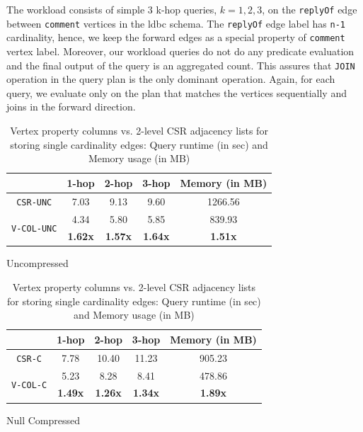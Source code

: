 The workload consists of simple 3 k-hop queries, $k=1,2,3$, on the \texttt{replyOf} edge between \texttt{comment} vertices in the \gls{ldbc} schema. The \texttt{replyOf} edge label has \texttt{n-1} cardinality, hence, we keep the forward edges as a special property of \texttt{comment} vertex label. Moreover, our workload queries do not do any predicate evaluation and the final output of the query is an aggregated count. This assures that \texttt{JOIN} operation in the query plan is the only dominant operation. Again, for each query, we evaluate only on the plan that matches the vertices sequentially and joins in the forward direction.

\begin{table}
	\centering
	\begin{subtable}{1\textwidth}
		\centering
		\bgroup
		\setlength{\tabcolsep}{8pt}
		\def\arraystretch{1.2}%
		\begin{tabular}{ |c|c|c|c|c| }
			\hline
			& \textbf{1-hop} & \textbf{2-hop} & \textbf{3-hop} & \textbf{Memory (in MB)} \\ 
			\hline \hline
			\texttt{CSR-UNC}& 7.03 & 9.13 & 9.60 & 1266.56 \\ 
			\hline
			\multirow{2}{*}{\texttt{V-COL-UNC}}& 4.34 & 5.80 & 5.85 & 839.93 \\ 
			& \textbf{1.62x} & \textbf{1.57x} & \textbf{1.64x} & \textbf{1.51x} \\ 
			\hline
		\end{tabular}
		\egroup
		\captionsetup{justification=centering}
		\caption{Uncompressed}
		\label{tbl:s1}
	\end{subtable}
	\begin{subtable}{1\textwidth}
		\centering
		\bgroup
		\setlength{\tabcolsep}{8pt}
		\def\arraystretch{1.2}
		\begin{tabular}{ |c|c|c|c|c| } 
			\hline
			& \textbf{1-hop} & \textbf{2-hop} & \textbf{3-hop} & \textbf{Memory (in MB)} \\ 
			\hline \hline
			\texttt{CSR-C}& 7.78 & 10.40 & 11.23 & 905.23 \\ 
			\hline
			\multirow{2}{*}{\texttt{V-COL-C}}& 5.23 & 8.28 & 8.41 & 478.86 \\ 
			& \textbf{1.49x} & \textbf{1.26x} & \textbf{1.34x} & \textbf{1.89x} \\ 
			\hline
		\end{tabular}
		\egroup
		\captionsetup{justification=centering}
		\caption{Null Compressed}
		\label{tbl:s2}
	\end{subtable}
	\captionsetup{justification=centering}
	\caption{Vertex property columns vs. 2-level CSR adjacency lists for storing single cardinality edges: Query runtime (in sec) and Memory usage (in MB)  }
\end{table}


